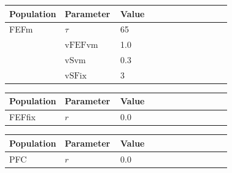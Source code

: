 \documentclass{article}
\begin{document}
\noindent
\begin{tabularx}{\linewidth}{|p{0.25\linewidth}|p{0.25\linewidth}|X|}\hline
\textbf{Population} & \textbf{Parameter} & \textbf{Value}   \\ \hline

    FEFm             & $\tau$        & 65  \\ \hline

                 & ${\text{vFEFvm}}$        & 1.0  \\ \hline

                 & ${\text{vSvm}}$        & 0.3  \\ \hline

                 & ${\text{vSFix}}$        & 3  \\ \hline

\end{tabularx}

\vspace{2ex}

\noindent
\begin{tabularx}{\linewidth}{|p{0.25\linewidth}|p{0.25\linewidth}|X|}\hline
\textbf{Population} & \textbf{Parameter} & \textbf{Value}   \\ \hline

    FEFfix             & $r$        & 0.0  \\ \hline

\end{tabularx}

\vspace{2ex}

\noindent
\begin{tabularx}{\linewidth}{|p{0.25\linewidth}|p{0.25\linewidth}|X|}\hline
\textbf{Population} & \textbf{Parameter} & \textbf{Value}   \\ \hline

    PFC             & $r$        & 0.0  \\ \hline

\end{tabularx}

\vspace{2ex}
\end{document}
